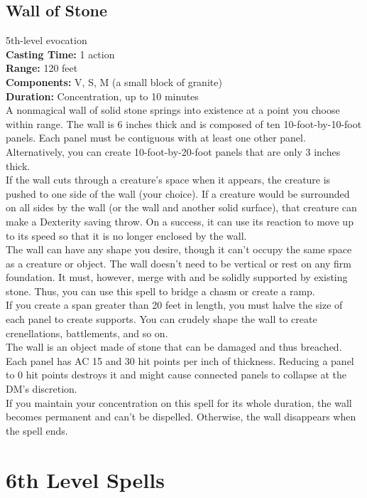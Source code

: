 \documentclass[11pt, A4paper, english]{article}
\begin{document}
		\subsection{Wall of Stone}
5th-level evocation \\
\textbf{Casting Time:} 1 action \\
\textbf{Range:} 120 feet \\
\textbf{Components:} V, S, M (a small block of granite) \\
\textbf{Duration:} Concentration, up to 10 minutes \\
A nonmagical wall of solid stone springs into existence at a point you choose within range. The wall is 6 inches thick and is composed of ten 10-foot-by-10-foot panels. Each panel must be contiguous with at least one other panel. Alternatively, you can create 10-foot-by-20-foot panels that are only 3 inches thick. \\
If the wall cuts through a creature’s space when it appears, the creature is pushed to one side of the wall (your choice). If a creature would be surrounded on all sides by the wall (or the wall and another solid surface), that creature can make a Dexterity saving throw. On a success, it can use its reaction to move up to its speed so that it is no longer enclosed by the wall. \\
The wall can have any shape you desire, though it can’t occupy the same space as a creature or object. The wall doesn’t need to be vertical or rest on any firm foundation. It must, however, merge with and be solidly supported by existing stone. Thus, you can use this spell to bridge a chasm or create a ramp. \\
If you create a span greater than 20 feet in length, you must halve the size of each panel to create supports. You can crudely shape the wall to create crenellations, battlements, and so on. \\
The wall is an object made of stone that can be damaged and thus breached. Each panel has AC 15 and 30 hit points per inch of thickness. Reducing a panel to 0 hit points destroys it and might cause connected panels to collapse at the DM’s discretion. \\
If you maintain your concentration on this spell for its whole duration, the wall becomes permanent and can’t be dispelled. Otherwise, the wall disappears when the spell ends.


	\section{6th Level Spells}
\end{document}
